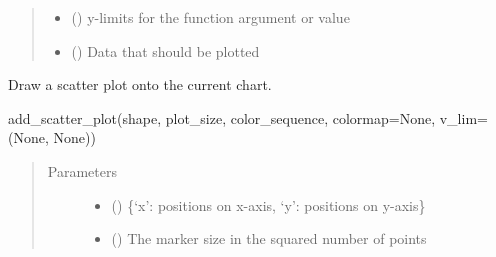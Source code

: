 \documentclass[letterpaper,10pt,english,openany,oneside]{sphinxmanual}
\begin{document}
\begin{fulllineitems}
\begin{fulllineitems}
\begin{quote}
\begin{description}
\begin{itemize}
\item {} 
 (\sphinxstyleliteralemphasis{\sphinxupquote{ {[}}}\sphinxstyleliteralemphasis{\sphinxupquote{{]}}}\sphinxstyleliteralemphasis{\sphinxupquote{, }}\sphinxstyleliteralemphasis{\sphinxupquote{, }}) \textendash{} y-limits for the function argument or value

\item {} 
 () \textendash{} Data that should be plotted

\end{itemize}

\end{description}\end{quote}

\end{fulllineitems}


\begin{fulllineitems}
\label{\detokenize{pygpc:pygpc.Visualization.Visualization.add_scatter_plot}}
Draw a scatter plot onto the current chart.

add\_scatter\_plot(shape, plot\_size, color\_sequence, colormap=None, v\_lim=(None, None))
\begin{quote}\begin{description}
\item[{Parameters}] \leavevmode\begin{itemize}
\item {} 
 () \textendash{} \{‘x’: positions on x-axis, ‘y’: positions on y-axis\}

\item {} 
 () \textendash{} The marker size in the squared number of points


\end{itemize}
\end{description}
\end{quote}
\end{fulllineitems}
\end{fulllineitems}
\end{document}
